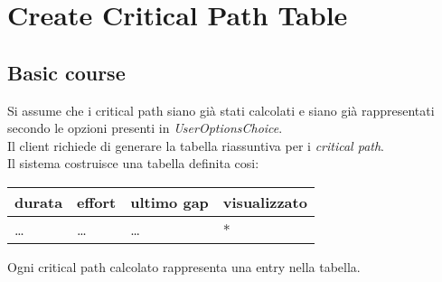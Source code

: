 \section{Create Critical Path Table}
\label{seq:createCriticalPathTable}

\subsection{Basic course}
Si assume che i critical path siano gi\`a stati calcolati e siano gi\`a
rappresentati secondo le opzioni presenti in \emph{UserOptionsChoice}.\\

Il client richiede di generare la tabella riassuntiva per i \emph{critical
path}.\\ 
Il sistema costruisce una tabella definita cosi:
\begin{table}[h!]
  \begin{center}
    \begin{tabular}{| l | l | l | l |}
    \hline
    \textbf{durata} & \textbf{effort} & \textbf{ultimo gap} &
    \textbf{visualizzato} \\
	\hline \ldots & \ldots & \ldots & *\\
    \hline
    \end{tabular}
  \end{center}
\end{table}
Ogni critical path calcolato rappresenta una entry nella tabella.
